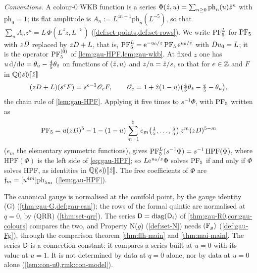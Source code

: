 \emph{Conventions.} A colour-$0$ WKB function is a series $\Phi(\hat{z},u)=\sum_{n\geq 0}\mathrm{ph}_n(u)\hat{z}^n$ with $\mathrm{ph}_0=1$; its flat amplitude is $A_n:=L^{4n+1}\mathrm{ph}_n(L^{-5})$, so that $\sum_n A_nz^n=L\,\Phi(L^4z,L^{-5})$ (\cref{def:set-points,def:set-rows}). We write $\mathrm{PF}_{5}^{L}$ for $\mathrm{PF}_{5}$ with $zD$ replaced by $zD+L$, that is, $\mathrm{PF}_{5}^{L}=\mathrm{e}^{-u_0/z}\,\mathrm{PF}_{5}\,\mathrm{e}^{u_0/z}$ with $D u_0=L$; it is the operator $\mathrm{PF}_{5}^{(0)}$ of \cref{lem:gau-HPF,lem:gau-wkb}. At fixed $z$ one has $u\,\mathrm{d}/\mathrm{d} u=\theta_u-\tfrac45\theta_{\hat{z}}$ on functions of $(\hat{z},u)$ and $z/u=\hat{z}/s$, so that for $e\in\mathbb{Z}$ and $F$ in $\mathbb{Q}(\!(s)\!)[\![ \hat{z} ]\!]$
\begin{equation}
\label{eq:con-chain}
(zD+L)(s^eF)=s^{e-1}\mathscr O_eF,\qquad \mathscr O_e=1+\hat{z}(1-u)\bigl(\tfrac45\theta_{\hat{z}}-\tfrac e5-\theta_u\bigr),
\end{equation}
the chain rule of \cref{lem:gau-HPF}. Applying it five times to $s^{-1}\Phi$, with $\mathrm{PF}_{5}$ written as
\[
\mathrm{PF}_{5}=u(zD)^5-1-(1-u)\sum_{m=1}^5e_m\bigl(\tfrac15,\dots,\tfrac55\bigr)\,z^m(zD)^{5-m}
\]
($e_m$ the elementary symmetric functions), gives $\mathrm{PF}_{5}^{L}(s^{-1}\Phi)=s^{-1}\,\mathrm{HPF}(\Phi)$, where $\mathrm{HPF}(\Phi)$ is the left side of \eqref{eq:gau-HPF}; so $L\mathrm{e}^{u_0/z}\Phi$ solves $\mathrm{PF}_{5}$ if and only if $\Phi$ solves HPF, as identities in $\mathbb{Q}(\!(s)\!)[\![ \hat{z} ]\!]$. The free coefficients of $\Phi$ are $\mathfrak{f}_m=[u^{4m}]\mathrm{ph}_{5m}$ (\cref{lem:gau-HPF}).

\begin{rmk}
\label{rmk:con-problem}
The canonical gauge is normalised at the conifold point, by the gauge identity (G) (\cref{thm:gau-G,def:gau-can}); the rows of the formal quintic are normalised at $q=0$, by (QRR) (\cref{thm:set-qrr}). The series $\mathsf{D}=\operatorname{diag}(\mathsf{D}_i)$ of \cref{thm:gau-R0,cor:gau-colours} compares the two, and Property N($g$) (\cref{def:set-N}) needs $(\mathrm{F}_{g})$ (\cref{def:gau-Fg}), through the comparison theorem \cref{thm:flh-main} and \cref{thm:mai-main}. The series $\mathsf{D}$ is a connection constant: it compares a series built at $u=0$ with its value at $u=1$. It is not determined by data at $q=0$ alone, nor by data at $u=0$ alone (\cref{lem:con-u0,rmk:con-model}).
\end{rmk}

